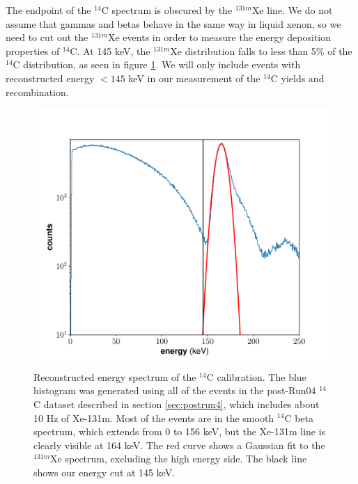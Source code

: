 The endpoint of the $^{14}$C spectrum is obscured by the $^{131m}$Xe line. We do not assume that gammas and betas behave in the same way in liquid xenon, so we need to cut out the $^{131m}$Xe events in order to measure the energy deposition properties of $^{14}$C. At 145 keV, the $^{131m}$Xe distribution falls to less than 5\% of the $^{14}$C distribution, as seen in figure \ref{fig:c14Ecut}. We will only include events with reconstructed energy $<145$ keV in our measurement of the $^{14}$C yields and recombination.
\begin{figure}[h!]
\centering
  \includegraphics[width=\textwidth]{Figures/C14_spec_init.pdf}
\caption{Reconstructed energy spectrum of the $^{14}$C calibration. The blue histogram was generated using all of the events in the post-Run04 $^{14}$C dataset described in section \ref{sec:postrun4}, which includes about 10 Hz of Xe-131m. Most of the events are in the smooth $^{14}$C beta spectrum, which extends from 0 to 156 keV, but the Xe-131m line is clearly visible at 164 keV. The red curve shows a Gaussian fit to the $^{131m}$Xe spectrum, excluding the high energy side. The black line shows our energy cut at 145 keV.}
\label{fig:c14Ecut}
\end{figure}



